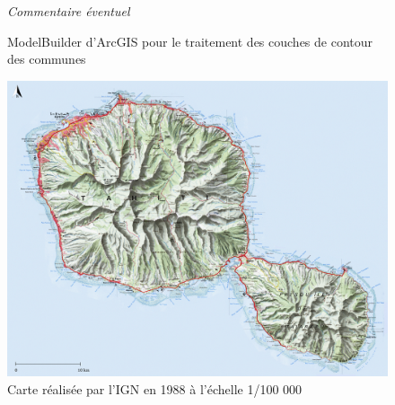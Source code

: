 \documentclass{themeensg}
\begin{document}
\begin{appendices}
\addtocounter{figure}{-1}
\begin{figure}
\addtocounter{figure}{1}
\centering
{}%
\caption{ModelBuilder d'ArcGIS pour le traitement des couches de contour des communes}%
\textit{Commentaire éventuel}
\end{figure}




\label{annexeign88}

\begin{figure}[!h]
\centering
\includegraphics[width=\linewidth]{images/Annexes/tahiti_ign_1988.png}%
\caption{Carte réalisée par l'IGN en 1988 à l'échelle 1/100 000}%
\label{carte1988}%
\end{figure}



\end{appendices}
\end{document}
